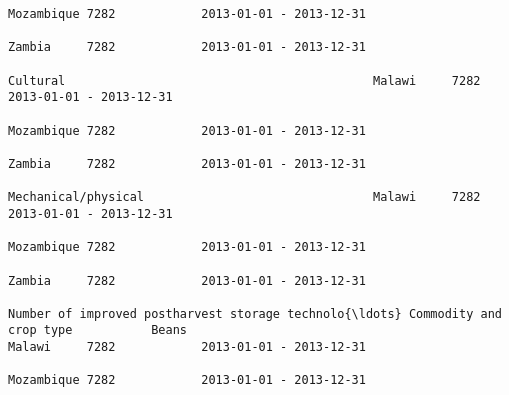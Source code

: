 \documentclass[11pt]{article}
\begin{document}
\begin{Verbatim}[commandchars=\\\{\}]
                                                                                                                                                                                                                 Mozambique 7282            2013-01-01 - 2013-12-31   
                                                                                                                                                                                                                 Zambia     7282            2013-01-01 - 2013-12-31   
                                                                                                                                                              Cultural                                           Malawi     7282            2013-01-01 - 2013-12-31   
                                                                                                                                                                                                                 Mozambique 7282            2013-01-01 - 2013-12-31   
                                                                                                                                                                                                                 Zambia     7282            2013-01-01 - 2013-12-31   
                                                                                                                                                              Mechanical/physical                                Malawi     7282            2013-01-01 - 2013-12-31   
                                                                                                                                                                                                                 Mozambique 7282            2013-01-01 - 2013-12-31   
                                                                                                                                                                                                                 Zambia     7282            2013-01-01 - 2013-12-31   
                                                                         Number of improved postharvest storage technolo{\ldots} Commodity and crop type           Beans                                              Malawi     7282            2013-01-01 - 2013-12-31   
                                                                                                                                                                                                                 Mozambique 7282            2013-01-01 - 2013-12-31   

\end{Verbatim}
\end{document}
